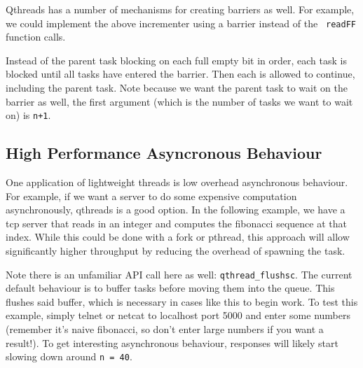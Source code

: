 \documentclass[12pt]{article}
\begin{document}
Qthreads has a number of mechanisms for creating barriers as well. For example,
we could implement the above incrementer using a barrier instead of the {\tt
readFF} function calls.



Instead of the parent task blocking on each full empty bit in order, each task
is blocked until all tasks have entered the barrier. Then each is allowed to
continue, including the parent task. Note because we want the parent task to
wait on the barrier as well, the first argument (which is the number of tasks we
want to wait on) is {\tt n+1}.

\subsection{High Performance Asyncronous Behaviour}

One application of lightweight threads is low overhead asynchronous behaviour.
For example, if we want a server to do some expensive computation
asynchronously, qthreads is a good option. In the following example, we have a
tcp server that reads in an integer and computes the fibonacci sequence at that
index. While this could be done with a fork or pthread, this approach will allow
significantly higher throughput by reducing the overhead of spawning the task.  



Note there is an unfamiliar API call here as well: {\tt qthread\_flushsc}. The
current default behaviour is to buffer tasks before moving them into the queue.
This flushes said buffer, which is necessary in cases like this to begin work.
To test this example, simply telnet or netcat to localhost port 5000 and
enter some numbers (remember it's naive fibonacci, so don't enter large numbers
if you want a result!). To get interesting asynchronous behaviour, responses will
likely start slowing down around {\tt n = 40}.

\end{document}
